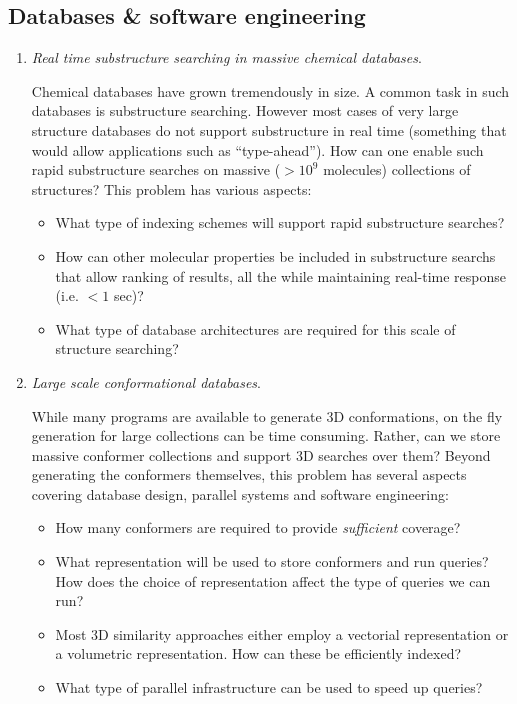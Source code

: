 \documentclass{sig-alternate}
\begin{document}
\subsection*{Databases \& software engineering}
\begin{enumerate}


\item \emph{Real time substructure searching in massive chemical
    databases}.

  Chemical databases have grown tremendously in size. A common task in
  such databases is substructure searching. However most cases of very
  large structure databases do not support substructure in real time
  (something that would allow applications such as
  ``type-ahead''). How can one enable such rapid substructure searches
  on massive ($> 10^9$ molecules) collections of structures? This
  problem has various aspects:
  \begin{itemize}
  \item What type of indexing schemes will support rapid substructure searches?
  \item How can other molecular properties be included in substructure
    searchs that allow ranking of results, all the while maintaining
    real-time response (i.e. $< 1$ sec)?
  \item What type of database architectures are required for this
    scale of structure searching?
  \end{itemize}

\item \emph{Large scale conformational databases}.

  While many programs are available to generate 3D conformations, on
  the fly generation for large collections can be time
  consuming. Rather, can we store massive conformer collections and
  support 3D searches over them? Beyond generating the conformers
  themselves, this problem has several aspects covering database
  design, parallel systems and software engineering:
  \begin{itemize}
  \item How many conformers are required to provide \emph{sufficient} coverage?
  \item What representation will be used to store conformers and run
    queries? How does the choice of representation affect the type of
    queries we can run?
  \item Most 3D similarity approaches either employ a vectorial
    representation or a volumetric representation. How can these be
    efficiently indexed?
  \item What type of parallel infrastructure can be used to speed up queries?
  \end{itemize}



\end{enumerate}
\end{document}
